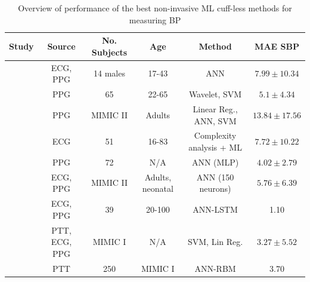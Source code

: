 \begin{landscape}
    \begin{table}[H]
        \caption{Overview of performance of  the best non-invasive ML cuff-less methods for measuring BP}
        \begin{tabular}{|c|c|c|c|c|c|}
        \hline
        \textbf{Study} & \textbf{Source} & \textbf{No. Subjects} & \textbf{Age} & \textbf{Method} & \textbf{MAE SBP} \\ \hline
        \cite{Yang2020} & ECG, PPG & 14 males & 17-43 & ANN & $7.99 \pm 10.34$\\
        \cite{Gao2016} & PPG & 65 & 22-65 & Wavelet, SVM & $5.1 \pm 4.34$\\
        \cite{Kachuee2015} & PPG & MIMIC II & Adults & Linear Reg., ANN, SVM &  $13.84\pm  17.56$\\
        \cite{Simjanoska20182} & ECG & 51 & 16-83 & Complexity analysis + ML &  $7.72 \pm  10.22$\\ 
        \cite{Wang2018} & PPG & 72 & N/A & ANN (MLP) & $4.02 \pm 2.79$\\
        \cite{Pradenas2020} & ECG, PPG & MIMIC II & Adults,  neonatal & ANN (150 neurons) & $5.76 \pm 6.39$\\
        \cite{Tanveer2018} & ECG, PPG & 39 & 20-100 & ANN-LSTM & 1.10\\
        \cite{Chen2019} & PTT, ECG, PPG & MIMIC I & N/A & SVM, Lin Reg. & $3.27 \pm 5.52$\\ 
        \cite{Ripoll2019} & PTT & 250 & MIMIC I & ANN-RBM & 3.70\\\hline
        \end{tabular}
        \label{litsurveytab2}
    \end{table}
\end{landscape}

